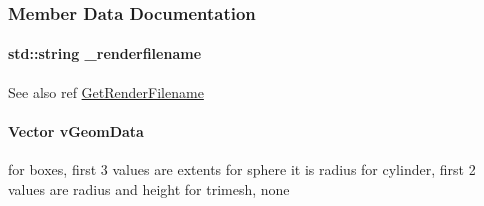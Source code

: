 \subsubsection{Member Data Documentation}
\hypertarget{classOpenRAVE_1_1KinBody_1_1Link_1_1GEOMPROPERTIES_a13d02d4b3303b3acce44af4330fb5fde}{
\paragraph[{\_\-renderfilename}]{\setlength{\rightskip}{0pt plus 5cm}std::string {\bf \_\-renderfilename}}\hfill}
\label{classOpenRAVE_1_1KinBody_1_1Link_1_1GEOMPROPERTIES_a13d02d4b3303b3acce44af4330fb5fde}
\begin{DoxySeeAlso}{See also}
ref \hyperlink{classOpenRAVE_1_1KinBody_1_1Link_1_1GEOMPROPERTIES_a4474cb22f6457503715435d2f3e34496}{GetRenderFilename} 
\end{DoxySeeAlso}
\hypertarget{classOpenRAVE_1_1KinBody_1_1Link_1_1GEOMPROPERTIES_ab53daa871a8650d27546b395400354e2}{
\paragraph[{vGeomData}]{\setlength{\rightskip}{0pt plus 5cm}Vector {\bf vGeomData}}\hfill}
\label{classOpenRAVE_1_1KinBody_1_1Link_1_1GEOMPROPERTIES_ab53daa871a8650d27546b395400354e2}
for boxes, first 3 values are extents for sphere it is radius for cylinder, first 2 values are radius and height for trimesh, none 